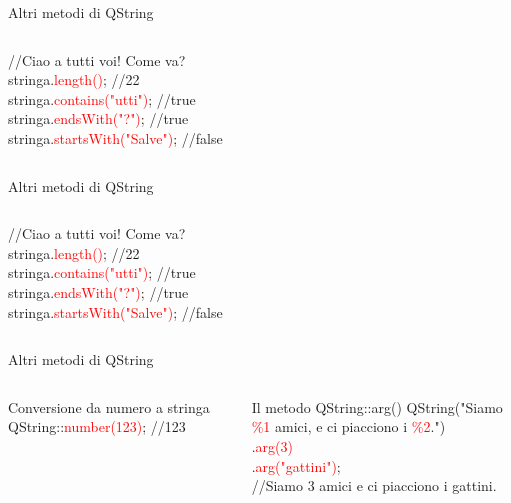 \documentclass[10pt]{beamer}
\begin{document}
\begin{frame}{Altri metodi di QString}
	\begin{columns}
		\begin{block}{}
			{\ttfamily //Ciao a tutti voi! Come va?\\
				\bigskip
				stringa.\textcolor{red}{length()}; //22\\
				\bigskip
				stringa.\textcolor{red}{contains("utti")}; //true\\
				\bigskip
				stringa.\textcolor{red}{endsWith("?")}; //true\\
				\bigskip
				stringa.\textcolor{red}{startsWith("Salve")}; //false}
		\end{block}
	\end{columns}
\end{frame}

\begin{frame}{Altri metodi di QString}
	\begin{columns}
		\column{0.7\textwidth}
		\begin{block}{}
			{\ttfamily //Ciao a tutti voi! Come va?\\
				\bigskip
				stringa.\textcolor{red}{length()}; //22\\
				\bigskip
				stringa.\textcolor{red}{contains("utti")}; //true\\
				\bigskip
				stringa.\textcolor{red}{endsWith("?")}; //true\\
				\bigskip
				stringa.\textcolor{red}{startsWith("Salve")}; //false}
		\end{block}
	\end{columns}
\end{frame}

\begin{frame}{Altri metodi di QString}
	\begin{columns}
		\column{0.8\textwidth}
		\begin{block}{Conversione da numero a stringa}
			{\ttfamily QString::\textcolor{red}{number(123)};  //123}
		\end{block}
		\bigskip

		\begin{block}{Il metodo QString::arg()}
			{\ttfamily QString("Siamo \textcolor{red}{\%1} amici, e ci piacciono i \textcolor{red}{\%2}.")\\
				.\textcolor{red}{arg(3)}\\
				.\textcolor{red}{arg("gattini")};\\
				//Siamo 3 amici e ci piacciono i gattini.}
		\end{block}
	\end{columns}
\end{frame}
\end{document}
